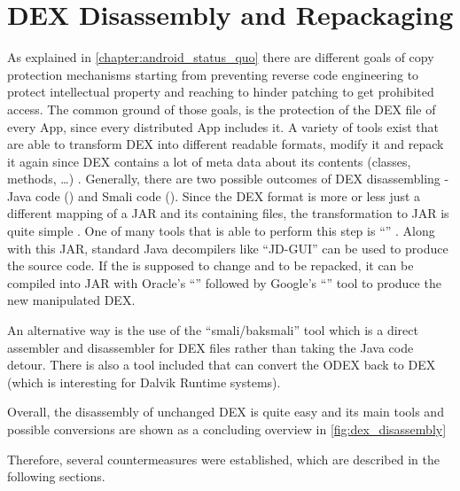 


\section{DEX Disassembly and Repackaging}
As explained in \autoref{chapter:android_status_quo} there
are different goals of copy protection mechanisms starting from
preventing reverse code engineering to protect intellectual property
and reaching to hinder patching to get prohibited access.
The common ground of those goals, is the protection of
the DEX file of every App, since every distributed App includes
it. A variety of tools exist that
are able to transform DEX into different readable formats,
modify it and repack it again since DEX contains
a lot of meta data about its contents (classes, methods, \ldots)
\parencite{dex}.
Generally, there are two possible outcomes of DEX disassembling
- Java code () and Smali code ().
Since the DEX format is more or less just a different mapping of a
JAR and its containing  files, the transformation to JAR
is quite simple \parencite{dvminternals}. One of many tools that is able to
perform this step is ``'' \parencite{dex2jartool}.
Along with this JAR, standard Java decompilers like ``JD-GUI''
\parencite{jdtool} can be used to produce the  source code.
If the  is supposed to change and to be repacked, it can
be compiled into JAR with Oracle's ``'' \parencite{javactool}
followed by Google's ``'' tool \parencite{dxtool}
to produce the new manipulated DEX.

An alternative way is the use of the ``smali/baksmali'' tool
\parencite{smalitool} which is a direct assembler and disassembler
for DEX files rather than taking the Java code detour. There is also
a tool included that can convert the ODEX back to DEX (which is interesting
for Dalvik Runtime systems).

Overall, the disassembly of unchanged DEX is quite easy and
its main tools and possible conversions are shown
as a concluding overview in \autoref{fig:dex_disassembly}

Therefore, several countermeasures were established, which are
described in the following sections.

